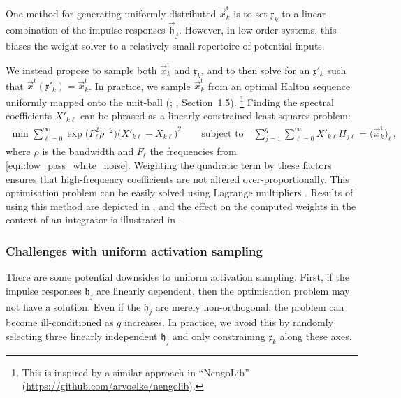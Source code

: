 One method for generating uniformly distributed $\vec{x}_k^\mathrm{t}$ is to set $\mathfrak{x}_k$ to a linear combination of the impulse responses $\vec{\mathfrak{h}}_j$.
However, in low-order systems, this biases the weight solver to a relatively small repertoire of potential inputs.

We instead propose to sample both $\vec{x}_k^\mathrm{t}$ and $\mathfrak{x}_k$, and to then solve for an $\mathfrak{x}'_k$ such that $\vec{x}^\mathrm{t}(\mathfrak{x}'_k) = \vec{x}_k^\mathrm{t}$.
In practice, we sample $\vec{x}_k^\mathrm{t}$ from an optimal Halton sequence uniformly mapped onto the unit-ball (\cite{chi2005optimal}; \cite{fang1994numbertheoretic}, Section~1.5).%
\footnote{This is inspired by a similar approach in \enquote{NengoLib} (\url{https://github.com/arvoelke/nengolib}).}
Finding the spectral coefficients $X'_{k\ell}$ can be phrased as a linearly-constrained least-squares problem:
\begin{align*}
	\min \sum\nolimits_{\ell = 0}^\infty \exp\bigl(F_\ell^2 \rho^{-2}\bigr) \bigl( X'_{k\ell} - X_{k\ell} \bigr)^2 \quad\quad \text{subject to} \quad \sum\nolimits_{j = 1}^q \sum\nolimits_{\ell = 0}^\infty X'_{k\ell} H_{j\ell} = \bigl( \vec{x}_k^\mathfrak{t} \bigr)_\ell \,,
\end{align*}
where $\rho$ is the bandwidth and $F_\ell$ the frequencies from \cref{eqn:low_pass_white_noise}.
Weighting the quadratic term by these factors ensures that high-frequency coefficients are not altered over-proportionally.
This optimisation problem can be easily solved using Lagrange multipliers \citep[cf.][Chapter~5]{boyd2004convex}.
Results of using this method are depicted in , and the effect on the computed weights in the context of an integrator is illustrated in .

\subsubsection{Challenges with uniform activation sampling}
There are some potential downsides to uniform activation sampling.
First, if the impulse responses $\mathfrak{h}_j$ are linearly dependent, then the optimisation problem may not have a solution.
Even if the $\mathfrak{h}_j$ are merely non-orthogonal, the problem can become ill-conditioned as $q$ increases.
In practice, we avoid this by randomly selecting three linearly independent $\mathfrak{h}_j$ and only constraining $\mathfrak{x}_k$ along these axes.

